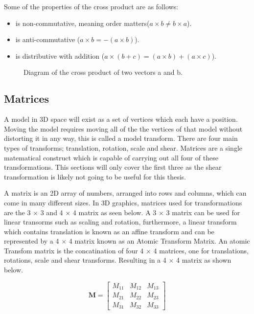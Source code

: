 \noindent
Some of the properties of the cross product are as follows:

\begin{itemize}
	\item is non-commutative, meaning order matters($a \times b \not= b \times a$).
	\item is anti-commutative ($a \times b = -(a \times b)$).
	\item is distributive with addition ($a \times (b + c) = (a \times b) + (a \times c)$).
\end{itemize}

\begin{figure}[htbp]
	{\centering
		\setlength{\fboxrule}{1pt}
		\vspace{7px}
		\caption{Diagram of the cross product of two vectors a and b.}
	}
\end{figure}
\FloatBarrier

\subsection{Matrices}

A model in 3D space will exist as a set of vertices which each have a position. Moving the model requires moving all of the the vertices of that model without distorting it in any way, this is called a model transform. There are four main types of transforms; translation, rotation, scale and shear. Matrices are a single matematical construct which is capable of carrying out all four of these transformations. This sections will only cover the first three as the shear transformation is likely not going to be useful for this thesis.    

A matrix is an 2D array of numbers, arranged into rows and columns, which can come in many different sizes. In 3D graphics, matrices used for transformations are the 3 $\times$ 3 and 4 $\times$ 4 matrix as seen below. A 3 $\times$ 3 matrix can be used for linear transorms such as scaling and rotation, furthermore, a linear transform which contains translation is known as an affine transform and can be represented by a 4 $\times$ 4 matrix known as an Atomic Transform Matrix. An atomic Transfom matrix is the concatination of four 4 $\times$ 4 matrices, one for translations, rotations, scale and shear transforms. Resulting in a 4 $\times$ 4 matrix as shown below. 

\begin{equation}
\textbf{M} = \begin{bmatrix}
M_{11} & M_{12} & M_{13} \\
M_{21} & M_{22} & M_{23} \\
M_{31} & M_{32} & M_{33}
\end{bmatrix}
\end{equation}

